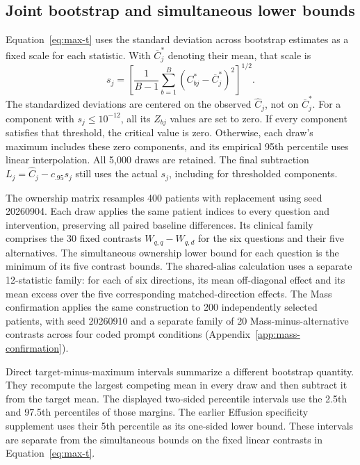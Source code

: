\subsection{Joint bootstrap and simultaneous lower bounds}
\label{app:simultaneous-bounds}

Equation~\ref{eq:max-t} uses the standard deviation across bootstrap
estimates as a fixed scale for each statistic. With $\overline C^*_j$
denoting their mean, that scale is
\begin{equation}
s_j=\left[\frac{1}{B-1}\sum_{b=1}^{B}
       (C^*_{bj}-\overline C^*_j)^2\right]^{1/2}.
\label{eq:bootstrap-scale}
\end{equation}
The standardized deviations are centered on the observed $\widehat C_j$,
not on $\overline C^*_j$. For a component with $s_j\leq10^{-12}$,
all its $Z_{bj}$ values are set to zero. If every component satisfies
that threshold, the critical value is zero. Otherwise, each draw's
maximum includes these zero components, and its empirical 95th percentile
uses linear interpolation. All 5,000 draws are retained. The final
subtraction $L_j=\widehat C_j-c_{.95}s_j$ still uses the actual $s_j$,
including for thresholded components.

The ownership matrix resamples 400 patients with replacement using seed
20260904. Each draw applies the same patient indices to every question
and intervention, preserving all paired baseline differences. Its clinical
family comprises the 30 fixed contrasts $W_{q,q}-W_{q,d}$ for the six
questions and their five alternatives. The simultaneous ownership lower
bound for each question is the minimum of its five contrast bounds.
The shared-alias calculation uses a separate 12-statistic family:
for each of six directions, its mean off-diagonal effect and its mean
excess over the five corresponding matched-direction effects.
The Mass confirmation applies the same construction to 200 independently
selected patients, with seed 20260910 and a separate family of 20
Mass-minus-alternative contrasts across four coded prompt conditions
(Appendix~\ref{app:mass-confirmation}).

Direct target-minus-maximum intervals summarize a different bootstrap
quantity. They recompute the largest competing mean in every draw and
then subtract it from the target mean. The displayed two-sided percentile
intervals use the 2.5th and 97.5th percentiles of those margins. The
earlier Effusion specificity supplement uses their 5th percentile as its
one-sided lower bound. These intervals are separate from the simultaneous
bounds on the fixed linear contrasts in Equation~\ref{eq:max-t}.

